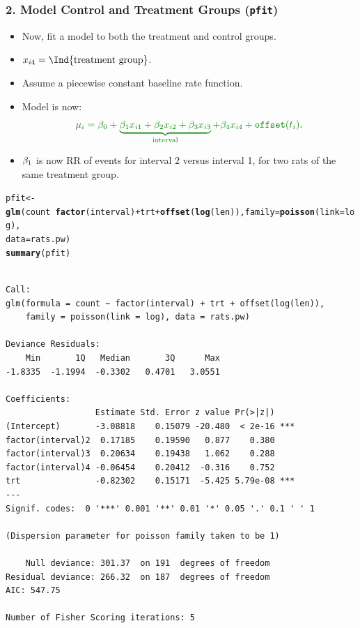 \documentclass[oneside]{book}\usepackage[]{graphicx}\usepackage[svgnames]{xcolor}
\makeatletter
\newcommand{\hlopt}[1]{\textcolor[rgb]{0,0,0}{#1}}%
\newcommand{\hlstd}[1]{\textcolor[rgb]{0.345,0.345,0.345}{#1}}%
\newcommand{\hlkwb}[1]{\textcolor[rgb]{0.69,0.353,0.396}{#1}}%
\newcommand{\hlkwc}[1]{\textcolor[rgb]{0.333,0.667,0.333}{#1}}%
\newcommand{\hlkwd}[1]{\textcolor[rgb]{0.737,0.353,0.396}{\textbf{#1}}}%
\newenvironment{kframe}{%
 \def\at@end@of@kframe{}%
 \ifinner\ifhmode%
  \def\at@end@of@kframe{\end{minipage}}%
  \begin{minipage}{\columnwidth}%
 \fi\fi%
 \def\FrameCommand##1{\hskip\@totalleftmargin \hskip-\fboxsep
 \colorbox{shadecolor}{##1}\hskip-\fboxsep
     \hskip-\linewidth \hskip-\@totalleftmargin \hskip\columnwidth}%
 \MakeFramed {\advance\hsize-\width
   \@totalleftmargin\z@ \linewidth\hsize
   \@setminipage}}%
 {\par\unskip\endMakeFramed%
 \at@end@of@kframe}
\newenvironment{knitrout}{}{} %
\let\exp\relax%
\let\log\relax%
\makeatother
\begin{document}
\subsubsection*{2. Model Control and Treatment Groups (\texttt{pfit})}
\begin{itemize}
      \item Now, fit a model to both the treatment and control groups.
      \item $ x_{i4}=\Ind{\text{treatment group}} $.
      \item Assume a piecewise constant baseline rate function.
      \item Model is now:
            \[ \textcolor{Green}{\log{\mu_i}=\beta_0+\underbrace{\beta_1x_{i1}+\beta_2x_{i2}+\beta_3x_{i3}}_{\text{interval}}+\beta_4x_{i4}+\texttt{offset}(\log{t_i})}. \]
      \item $ \exp{\beta_1} $ is now RR of events for interval 2 versus interval 1, for two rats of the
            same treatment group.
\end{itemize}
\begin{knitrout}
\color{fgcolor}\begin{kframe}
\begin{alltt}
\hlstd{pfit} \hlkwb{<-} \hlkwd{glm}\hlstd{(count} \hlopt{~} \hlkwd{factor}\hlstd{(interval)} \hlopt{+} \hlstd{trt} \hlopt{+} \hlkwd{offset}\hlstd{(}\hlkwd{log}\hlstd{(len)),} \hlkwc{family} \hlstd{=} \hlkwd{poisson}\hlstd{(}\hlkwc{link} \hlstd{= log),}
  \hlkwc{data} \hlstd{= rats.pw)}
\hlkwd{summary}\hlstd{(pfit)}
\end{alltt}
\begin{verbatim}

Call:
glm(formula = count ~ factor(interval) + trt + offset(log(len)), 
    family = poisson(link = log), data = rats.pw)

Deviance Residuals: 
    Min       1Q   Median       3Q      Max  
-1.8335  -1.1994  -0.3302   0.4701   3.0551  

Coefficients:
                  Estimate Std. Error z value Pr(>|z|)    
(Intercept)       -3.08818    0.15079 -20.480  < 2e-16 ***
factor(interval)2  0.17185    0.19590   0.877    0.380    
factor(interval)3  0.20634    0.19438   1.062    0.288    
factor(interval)4 -0.06454    0.20412  -0.316    0.752    
trt               -0.82302    0.15171  -5.425 5.79e-08 ***
---
Signif. codes:  0 '***' 0.001 '**' 0.01 '*' 0.05 '.' 0.1 ' ' 1

(Dispersion parameter for poisson family taken to be 1)

    Null deviance: 301.37  on 191  degrees of freedom
Residual deviance: 266.32  on 187  degrees of freedom
AIC: 547.75

Number of Fisher Scoring iterations: 5
\end{verbatim}
\end{kframe}
\end{knitrout}
\end{document}
